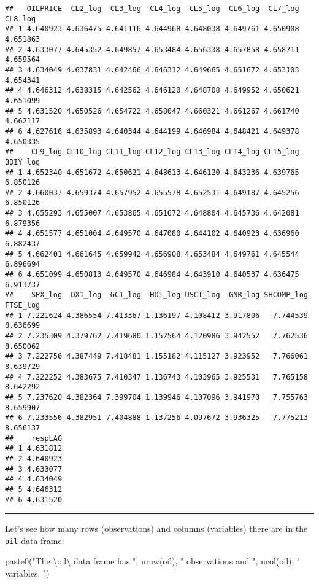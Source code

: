 \documentclass[
]{article}
\newenvironment{Shaded}{\begin{snugshade}}{\end{snugshade}}
\newcommand{\FunctionTok}[1]{\textcolor[rgb]{0.00,0.00,0.00}{#1}}
\newcommand{\NormalTok}[1]{#1}
\newcommand{\SpecialCharTok}[1]{\textcolor[rgb]{0.00,0.00,0.00}{#1}}
\newcommand{\StringTok}[1]{\textcolor[rgb]{0.31,0.60,0.02}{#1}}
\begin{document}
\begin{verbatim}
##   OILPRICE  CL2_log  CL3_log  CL4_log  CL5_log  CL6_log  CL7_log  CL8_log
## 1 4.640923 4.636475 4.641116 4.644968 4.648038 4.649761 4.650908 4.651863
## 2 4.633077 4.645352 4.649857 4.653484 4.656338 4.657858 4.658711 4.659564
## 3 4.634049 4.637831 4.642466 4.646312 4.649665 4.651672 4.653103 4.654341
## 4 4.646312 4.638315 4.642562 4.646120 4.648708 4.649952 4.650621 4.651099
## 5 4.631520 4.650526 4.654722 4.658047 4.660321 4.661267 4.661740 4.662117
## 6 4.627616 4.635893 4.640344 4.644199 4.646984 4.648421 4.649378 4.650335
##    CL9_log CL10_log CL11_log CL12_log CL13_log CL14_log CL15_log BDIY_log
## 1 4.652340 4.651672 4.650621 4.648613 4.646120 4.643236 4.639765 6.850126
## 2 4.660037 4.659374 4.657952 4.655578 4.652531 4.649187 4.645256 6.850126
## 3 4.655293 4.655007 4.653865 4.651672 4.648804 4.645736 4.642081 6.879356
## 4 4.651577 4.651004 4.649570 4.647080 4.644102 4.640923 4.636960 6.882437
## 5 4.662401 4.661645 4.659942 4.656908 4.653484 4.649761 4.645544 6.896694
## 6 4.651099 4.650813 4.649570 4.646984 4.643910 4.640537 4.636475 6.913737
##    SPX_log  DX1_log  GC1_log  HO1_log USCI_log  GNR_log SHCOMP_log FTSE_log
## 1 7.221624 4.386554 7.413367 1.136197 4.108412 3.917806   7.744539 8.636699
## 2 7.235309 4.379762 7.419680 1.152564 4.120986 3.942552   7.762536 8.650062
## 3 7.222756 4.387449 7.418481 1.155182 4.115127 3.923952   7.766061 8.639729
## 4 7.222252 4.383675 7.410347 1.136743 4.103965 3.925531   7.765158 8.642292
## 5 7.237620 4.382364 7.399704 1.139946 4.107096 3.941970   7.755763 8.659907
## 6 7.233556 4.382951 7.404888 1.137256 4.097672 3.936325   7.775213 8.656137
##    respLAG
## 1 4.631812
## 2 4.640923
## 3 4.633077
## 4 4.634049
## 5 4.646312
## 6 4.631520
\end{verbatim}

\begin{center}\rule{0.5\linewidth}{0.5pt}\end{center}

Let's see how many rows (observations) and columns (variables) there are
in the \texttt{oil} data frame:

\begin{Shaded}
\begin{Highlighting}[]
\FunctionTok{paste0}\NormalTok{(}\StringTok{"The }\SpecialCharTok{\textbackslash{}\textquotesingle{}}\StringTok{oil}\SpecialCharTok{\textbackslash{}\textquotesingle{}}\StringTok{ data frame has "}\NormalTok{, }\FunctionTok{nrow}\NormalTok{(oil), }\StringTok{" observations and  "}\NormalTok{, }\FunctionTok{ncol}\NormalTok{(oil), }\StringTok{" variables. "}\NormalTok{)}
\end{Highlighting}
\end{Shaded}
\end{document}

